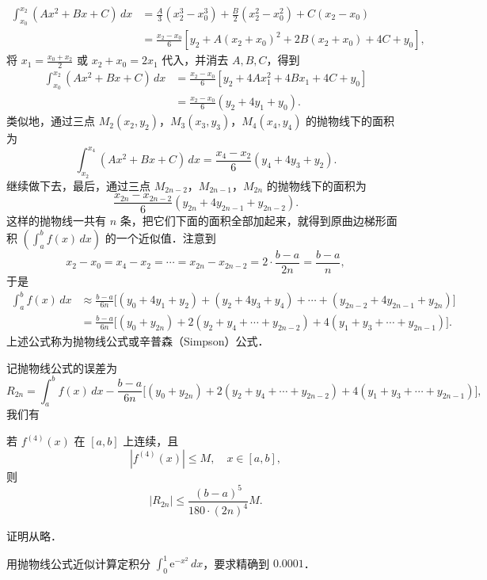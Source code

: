 \begin{align*}
\int_{x_0}^{x_2}(Ax^2 + Bx + C)\,dx &= \frac{A}{3}(x_2^3 - x_0^3) + \frac{B}{2}(x_2^2 - x_0^2) + C(x_2 - x_0) \\
&= \frac{x_2 - x_0}{6}\left[y_2 + A(x_2 + x_0)^2 + 2B(x_2 + x_0) + 4C + y_0\right],
\end{align*}
将 $x_1 = \frac{x_0 + x_2}{2}$ 或 $x_2 + x_0 = 2x_1$ 代入，并消去 $A, B, C$，得到
\begin{align*}
\int_{x_0}^{x_2}(Ax^2 + Bx + C)\,dx &= \frac{x_2 - x_0}{6}\left[y_2 + 4Ax_1^2 + 4Bx_1 + 4C + y_0\right] \\
&= \frac{x_2 - x_0}{6}(y_2 + 4y_1 + y_0).
\end{align*}
类似地，通过三点 $M_2(x_2, y_2)$，$M_3(x_3, y_3)$，$M_4(x_4, y_4)$ 的抛物线下的面积为
\[
\int_{x_2}^{x_4}(Ax^2 + Bx + C)\,dx = \frac{x_4 - x_2}{6}(y_4 + 4y_3 + y_2).
\]
继续做下去，最后，通过三点 $M_{2n-2}$，$M_{2n-1}$，$M_{2n}$ 的抛物线下的面积为
\[
\frac{x_{2n} - x_{2n-2}}{6}(y_{2n} + 4y_{2n-1} + y_{2n-2}).
\]
这样的抛物线一共有 $n$ 条，把它们下面的面积全部加起来，就得到原曲边梯形面积 $\left(\int_a^b f(x)\,dx\right)$ 的一个近似值．注意到
\[
x_2 - x_0 = x_4 - x_2 = \cdots = x_{2n} - x_{2n-2} = 2\cdot\frac{b - a}{2n} = \frac{b - a}{n},
\]
于是
\begin{align*}
\int_a^b f(x)\,dx &\approx \frac{b - a}{6n}\Big[(y_0 + 4y_1 + y_2) + (y_2 + 4y_3 + y_4) + \cdots + (y_{2n-2} + 4y_{2n-1} + y_{2n})\Big] \\
&= \frac{b - a}{6n}\Big[(y_0 + y_{2n}) + 2(y_2 + y_4 + \cdots + y_{2n-2}) + 4(y_1 + y_3 + \cdots + y_{2n-1})\Big].
\end{align*}
上述公式称为抛物线公式或辛普森（Simpson）公式．

记抛物线公式的误差为
\[
R_{2n} = \int_a^b f(x)\,dx - \frac{b - a}{6n}\Big[(y_0 + y_{2n}) + 2(y_2 + y_4 + \cdots + y_{2n-2}) + 4(y_1 + y_3 + \cdots + y_{2n-1})\Big],
\]
我们有

\begin{theorem}\label{thm:7-16}
若 $f^{(4)}(x)$ 在 $[a,b]$ 上连续，且
\[
|f^{(4)}(x)| \leqslant M, \quad x \in [a,b],
\]
则
\[
|R_{2n}| \leqslant \frac{(b - a)^5}{180\cdot(2n)^4}M.
\]
\end{theorem}

证明从略．

\begin{example}
用抛物线公式近似计算定积分 $\displaystyle \int_0^1 \mathrm{e}^{-x^2}\,dx$，要求精确到 $0.0001$．
\end{example}

